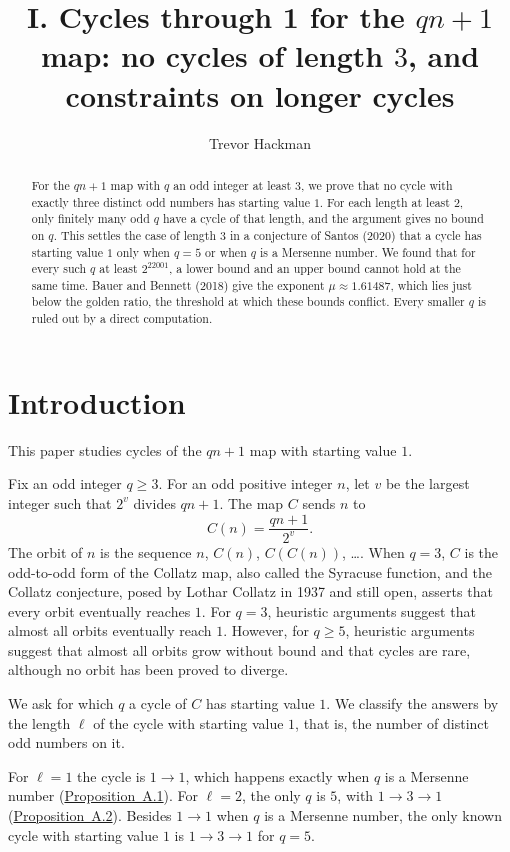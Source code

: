 \documentclass[11pt]{article}
\title{I. Cycles through 1 for the $qn+1$ map: no cycles of length $3$, and constraints on longer cycles}
\author{Trevor Hackman}
\date{}
\begin{document}
\maketitle

\begin{abstract}
\noindent
For the $qn+1$ map with $q$ an odd integer at least $3$, we prove that no cycle with exactly three distinct odd numbers has starting value $1$.
For each length at least $2$, only finitely many odd $q$ have a cycle of that length, and the argument gives no bound on $q$.
This settles the case of length $3$ in a conjecture of Santos (2020) that a cycle has starting value $1$ only when $q = 5$ or when $q$ is a Mersenne number.
We found that for every such $q$ at least $2^{22001}$, a lower bound and an upper bound cannot hold at the same time.
Bauer and Bennett (2018) give the exponent $\mu \approx 1.61487$, which lies just below the golden ratio, the threshold at which these bounds conflict.
Every smaller $q$ is ruled out by a direct computation.
\end{abstract}

\begingroup
\setlength{\parskip}{0pt}
\small
\tableofcontents
\endgroup

\section{Introduction}
\label{sec:introduction}

This paper studies cycles of the $qn+1$ map with starting value $1$.

Fix an odd integer $q \ge 3$.
For an odd positive integer $n$, let $v$ be the largest integer such that $2^v$ divides $qn+1$.
The map $C$ sends $n$ to
\[
C(n) = \frac{qn+1}{2^v}.
\]
The orbit of $n$ is the sequence $n$, $C(n)$, $C(C(n))$, \ldots.
When $q = 3$, $C$ is the odd-to-odd form of the Collatz map, also called the Syracuse function, and the Collatz conjecture, posed by Lothar Collatz in 1937 and still open, asserts that every orbit eventually reaches $1$.
For $q = 3$, heuristic arguments suggest that almost all orbits eventually reach $1$.
However, for $q \ge 5$, heuristic arguments suggest that almost all orbits grow without bound and that cycles are rare, although no orbit has been proved to diverge.

We ask for which $q$ a cycle of $C$ has starting value $1$.
We classify the answers by the length $\ell$ of the cycle with starting value $1$, that is, the number of distinct odd numbers on it.

For $\ell = 1$ the cycle is $1 \to 1$, which happens exactly when $q$ is a Mersenne number (\hyperref[prop:a1]{Proposition~A.1}).
For $\ell = 2$, the only $q$ is $5$, with $1 \to 3 \to 1$ (\hyperref[prop:a2]{Proposition~A.2}).
Besides $1 \to 1$ when $q$ is a Mersenne number, the only known cycle with starting value $1$ is $1 \to 3 \to 1$ for $q = 5$.
\end{document}
